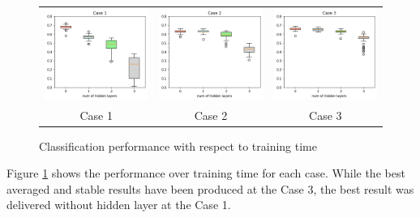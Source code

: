 \documentclass[letterpaper, 10 pt, conference]{ieeeconf}  %
\begin{document}
\begin{figure}[tbh]
    \centering
    \begin{centering}
    \begin{tabular}{ccc}
        \includegraphics[width=0.30\linewidth, trim=0cm 0cm 0cm 0.65cm, clip=true]{10trials/boxPlotHlayersC1}&
        \includegraphics[width=0.30\linewidth, trim=0cm 0cm 0cm 0.65cm, clip=true]{10trials/boxPlotHlayersC2}&
        \includegraphics[width=0.30\linewidth, trim=0cm 0cm 0cm 0.65cm, clip=true]{10trials/boxPlotHlayersC3}\\
        Case 1 & Case 2 & Case 3
        \end{tabular}
     \end{centering}
     \caption{Classification performance with respect to training time}
     \label{fig:bpTtime}
    \vspace{-10pt}
\end{figure}

Figure \ref{fig:bpTtime} shows the performance over training time for each case. While the best averaged and stable results have been produced at the Case 3, the best result was delivered without hidden layer at the Case 1.
\end{document}
